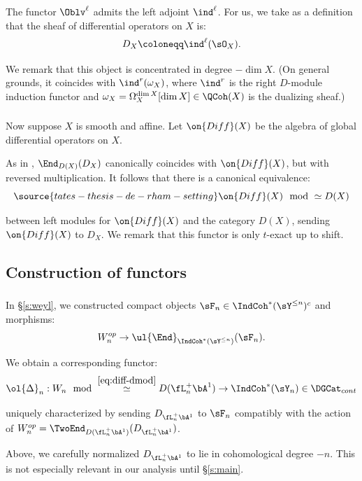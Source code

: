 The functor $\Oblv^{\ell}$ admits the left adjoint
$\ind^{\ell}$. For us, we take as a definition that the sheaf of
differential operators on $X$ is:
%
\[
D_X \coloneqq \ind^{\ell}(\sO_X).
\]

 We remark that this object is concentrated in degree $-\dim X$.
(On general grounds, it coincides with $\ind^r(\omega_X)$, where
$\ind^r$ is the right $D$-module induction functor and
$\omega_X = \Omega_X^{\dim X}[\dim X] \in \QCoh(X)$ is the
dualizing sheaf.)

\subsubsection{}

Now suppose $X$ is smooth and affine. Let $\on{Diff}(X)$ be the
algebra of global differential operators on $X$.

As in \cite{crystals}, $\End_{D(X)}(D_X)$ canonically coincides with
$\on{Diff}(X)$, but with reversed multiplication. It follows that there
is a canonical equivalence:
%
\begin{equation}\label{eq:diff-dmod}
\source{tates-thesis-de-rham-setting}
\on{Diff}(X)\mod \simeq D(X)
\end{equation}

 between left modules for $\on{Diff}(X)$ and the category $D(X)$,
sending $\on{Diff}(X)$ to $D_X$. We remark that this functor is only
$t$-exact up to shift.

\subsection{Construction of functors}

\subsubsection{}

In \S \ref{s:weyl}, we constructed compact objects
$\sF_n \in \IndCoh^*(\sY^{\leq n})^c$ and morphisms:
%
\[
W_n^{op} \to \ul{\End}_{\IndCoh^*(\sY^{\leq n})}(\sF_n).
\]

 We obtain a corresponding functor:
%
\[
\ol{\Delta}_n:W_n\mod
\overset{\eqref{eq:diff-dmod}}{\simeq}
D(\fL_n^+\bA^1) \to \IndCoh^*(\sY_n)
\in \DGCat_{cont}
\]

 uniquely characterized by sending $D_{\fL_n^+\bA^1}$ to
$\sF_n$ compatibly with the action of $W_n^{op} =
\TwoEnd_{D(\fL_n^+\bA^1)}(D_{\fL_n^+\bA^1})$.

\begin{rem}
\notready

Above, we carefully normalized $D_{\fL_n^+ \bA^1}$ to lie in cohomological
degree $-n$. This is not especially relevant in our analysis
until \S \ref{s:main}.

\end{rem}



